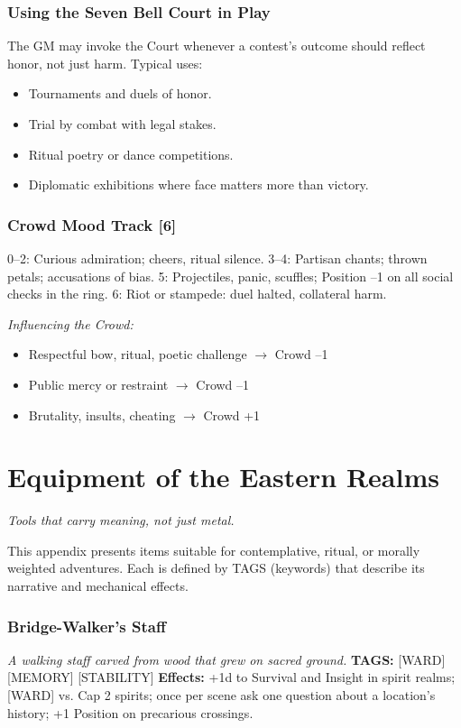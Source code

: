 \documentclass[12pt,oneside]{book}
\begin{document}
\subsection*{Using the Seven Bell Court in Play}
The GM may invoke the Court whenever a contest's outcome should reflect honor, not just harm. Typical uses:
\begin{itemize}
  \item Tournaments and duels of honor.
  \item Trial by combat with legal stakes.
  \item Ritual poetry or dance competitions.
  \item Diplomatic exhibitions where face matters more than victory.
\end{itemize}

\subsection*{Crowd Mood Track [6]}
0--2: Curious admiration; cheers, ritual silence.  
3--4: Partisan chants; thrown petals; accusations of bias.  
5: Projectiles, panic, scuffles; Position --1 on all social checks in the ring.  
6: Riot or stampede: duel halted, collateral harm.

\noindent\textit{Influencing the Crowd:}
\begin{itemize}
  \item Respectful bow, ritual, poetic challenge $\rightarrow$ Crowd --1
  \item Public mercy or restraint $\rightarrow$ Crowd --1
  \item Brutality, insults, cheating $\rightarrow$ Crowd +1
\end{itemize}

\chapter{Equipment of the Eastern Realms}
\emph{Tools that carry meaning, not just metal.}

This appendix presents items suitable for contemplative, ritual, or morally weighted adventures. Each is defined by TAGS (keywords) that describe its narrative and mechanical effects.

\subsection*{Bridge-Walker's Staff}
\textit{A walking staff carved from wood that grew on sacred ground.}  
\textbf{TAGS:} [WARD] [MEMORY] [STABILITY]  
\textbf{Effects:} +1d to Survival and Insight in spirit realms; [WARD] vs. Cap 2 spirits; once per scene ask one question about a location's history; +1 Position on precarious crossings.
\end{document}
